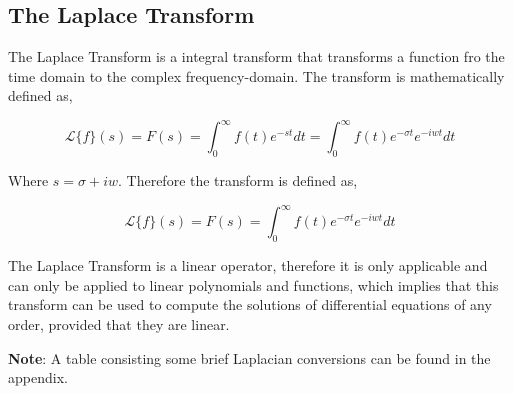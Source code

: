 

\subsection{{The Laplace Transform}}

	{The Laplace Transform is a integral transform that transforms a function fro the time domain to the complex frequency-domain. The transform is mathematically defined as,}

		$$\mathcal{L}\{f\}(s) = F(s) = \int_0^{\infty}f(t)e^{-st} dt = \int_0^{\infty}f(t)e^{-\sigma t}e^{-iwt} dt$$

	{Where $s = \sigma + iw$. Therefore the transform is defined as,}
	
		$$\mathcal{L}\{f\}(s) = F(s) = \int_0^{\infty}f(t)e^{-\sigma t}e^{-iwt} dt$$
	
	{The Laplace Transform is a linear operator, therefore it is only applicable and can only be applied to linear polynomials and functions, which implies that this transform can be used to compute the solutions of differential equations of any order, provided that they are linear.}
	
	{\textbf{Note}: A table consisting some brief Laplacian conversions can be found in the appendix.}	
	
	
	
